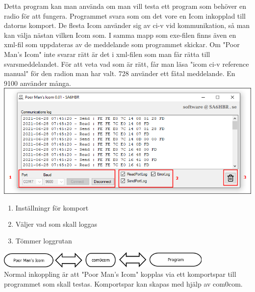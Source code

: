 \documentclass[a4paper]{article}
\begin{document}
Detta program kan man använda om man vill testa ett program som behöver en radio för att fungera.
\newline
Programmet svara som om det vore en Icom inkopplad till datorns komport. De flesta Icom använder sig av ci-v vid kommunikation, så man kan välja nästan vilken Icom som.
I samma mapp som exe-filen finns även en xml-fil som uppdateras av de meddelande som programmet skickar.
Om "Poor Man's Icom" inte svarar rätt är det i xml-filen som man får rätta till svarsmeddelandet. För att veta vad som är rätt, får man läsa "icom ci-v reference manual" för den radion man har valt. 728 använder ett fåtal meddelande. En 9100 använder många.
\vspace*{20px}
\newline
\includegraphics[width=1\textwidth]{../image/PoorMansIcomInfo.png}\\[0.5cm] 


\begin{enumerate}   
\item Inställningr för komport
\item Väljer vad som skall loggas
\item Tömmer loggrutan
\end{enumerate}  

\vspace*{50px}
\includegraphics[width=0.8\textwidth]{../image/Diagram1.png}\\[1cm] 
Normal inkoppling är att "Poor Man's Icom" kopplas via ett komportspar till programmet som skall testas.
\newline
Komportspar kan skapas med hjälp av com0com.
\newpage
\end{document}

